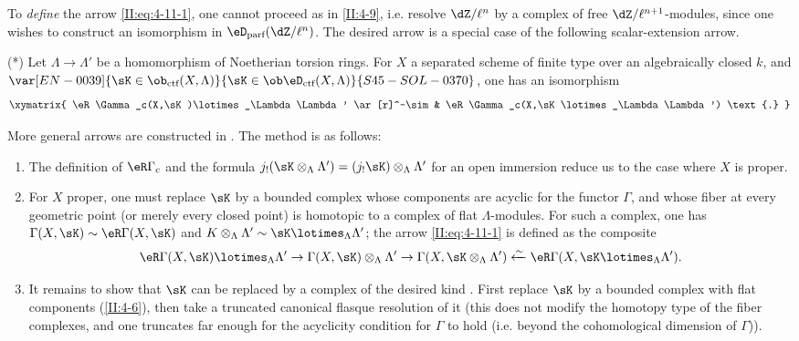 To \emph{define} the arrow \eqref{II:eq:4-11-1}, one cannot proceed as in
\ref{II:4-9}, i.e. resolve $\dZ/\ell^n$ by a complex of free
$\dZ/\ell^{n+1}$-modules, since one wishes to construct an isomorphism in
$\eD_\text{parf}(\dZ/\ell^n)$. The desired arrow is a special case of the
following scalar-extension arrow.

(*) Let $\Lambda\to\Lambda'$ be a homomorphism of Noetherian torsion rings.
For $X$ a separated scheme of finite type over an algebraically closed $k$,
and $\var[EN-0039]{\sK\in\ob_{\text{ctf}}(X,\Lambda)}{\sK\in\ob\eD_\text{ctf}(X,\Lambda)}{S45-SOL-0370}$, one has an isomorphism
\[\xymatrix{
  \eR\Gamma_c(X,\sK)\lotimes_\Lambda \Lambda' \ar[r]^-\sim & \eR \Gamma_c(X,\sK\lotimes_\Lambda \Lambda') \text{.}
}\]

More general arrows are constructed in . The method
is as follows:
\begin{enumerate}[\indent a)]
  \item {}The definition of $\eR\Gamma_c$ and the formula
    $j_!(\sK\otimes_\Lambda\Lambda') = (j_! \sK)\otimes_\Lambda\Lambda'$ for
    an open immersion reduce us to the case where $X$ is proper.
  \item For $X$ proper, one must replace $\sK$ by a bounded complex whose
    components are acyclic for the functor $\Gamma$, and whose fiber at every
    geometric point (or merely every closed point) is homotopic to a complex
    of flat $\Lambda$-modules. For such a complex, one has
    $\Gamma(X,\sK)\sim \eR\Gamma(X,\sK)$ and
    $K\otimes_\Lambda\Lambda'\sim \sK\lotimes_\Lambda\Lambda'$; the arrow
    \eqref{II:eq:4-11-1} is defined as the composite
    \[
      \eR\Gamma(X,\sK)\lotimes_\Lambda \Lambda' \to \Gamma(X,\sK)\otimes_\Lambda\Lambda' \to \Gamma(X,\sK\otimes_\Lambda\Lambda') \xleftarrow\sim \eR\Gamma(X,\sK\lotimes_\Lambda\Lambda') \text{.}
    \]
  \item It remains to show that $\sK$ can be replaced by a complex of the
    desired kind . First replace $\sK$ by a bounded
    complex with flat components (\ref{II:4-6}), then take a truncated
    canonical flasque resolution of it (this does not modify the homotopy
    type of the fiber complexes, and one truncates far enough for the
    acyclicity condition for $\Gamma$ to hold (i.e. beyond the cohomological
    dimension of $\Gamma$)).
\end{enumerate}






